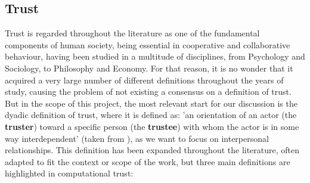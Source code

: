 \subsection{Trust}
\label{subsec:Trust}
Trust is regarded throughout the literature as one of the fundamental components of human society, being essential in cooperative and collaborative behaviour, having been studied in a multitude of disciplines, from Psychology and Sociology, to Philosophy and Economy\cite{Rousseau1998, Jones1997, Sabater2005}. For that reason, it is no wonder that it acquired a very large number of different definitions throughout the years of study, causing the problem of not existing a consensus on a definition of trust\cite{Castelfranchi2010}. But in the scope of this project, the most relevant start for our discussion is the dyadic definition of trust, where it is defined as: 'an orientation of an actor (the \textbf{truster}) toward a specific person (the \textbf{trustee}) with whom the actor is in some way interdependent' (taken from \cite{Simpson2007}), as we want to focus on interpersonal relationships. This definition has been expanded throughout the literature, often adapted to fit the context or scope of the work, but three main definitions are highlighted in computational trust:
